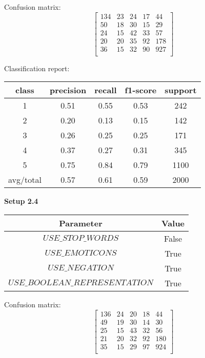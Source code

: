 \documentclass[12pt]{report}
\begin{document}
Confusion matrix:
\[
\begin{bmatrix}
134 & 23 & 24 & 17 & 44 \\
50 & 18 & 30 & 15 & 29 \\
24 & 15 & 42 & 33 & 57 \\
20 & 20 & 35 & 92 & 178 \\
36 & 15 & 32 & 90 & 927 \\
\end{bmatrix}
\]

Classification report:

\begin{center}
	\begin{tabular}{c | c | c | c | c }
		\hline
		class & precision & recall & f1-score & support \\ \hline
		1 & 0.51 & 0.55 & 0.53 & 242 \\ \hline
		2 & 0.20 & 0.13 & 0.15 & 142 \\ \hline
		3 & 0.26 & 0.25 & 0.25 & 171 \\ \hline
		4 & 0.37 & 0.27 & 0.31 & 345 \\ \hline
		5 & 0.75 & 0.84 & 0.79 & 1100 \\ \hline
		avg/total & 0.57 & 0.61 & 0.59 & 2000 \\ \hline
	\end{tabular}
\end{center}


\textbf{Setup 2.4}

\begin{center}
	\begin{tabular}{ c | c }
		\hline
		Parameter & Value \\ \hline
		$USE\_STOP\_WORDS$ & False \\ \hline
		$USE\_EMOTICONS$ & True \\ \hline
		$USE\_NEGATION$ & True \\ \hline
		$USE\_BOOLEAN\_REPRESENTATION$ & True \\ \hline
	\end{tabular}
\end{center}

Confusion matrix:
\[
\begin{bmatrix}
136 & 24 & 20 & 18 & 44 \\
49 & 19 & 30 & 14 & 30 \\
25 & 15 & 43 & 32 & 56 \\
21 & 20 & 32 & 92 & 180 \\
35 & 15 & 29 & 97 & 924 \\
\end{bmatrix}
\]
\end{document}
